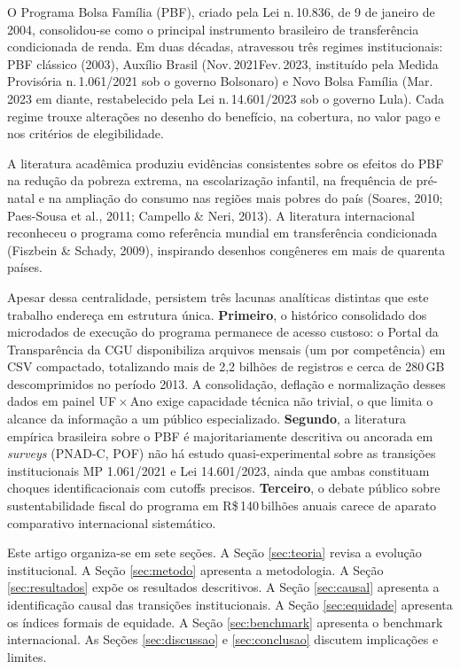 \documentclass[12pt,a4paper,oneside]{article}
\newcommand{\rs}{R\$\,}
\begin{document}
O Programa Bolsa Família (PBF), criado pela Lei n.\,10.836, de 9 de
janeiro de 2004, consolidou-se como o principal instrumento brasileiro
de transferência condicionada de renda. Em duas décadas, atravessou
três regimes institucionais: PBF clássico (2003),
Auxílio Brasil (Nov.\,2021\textendash Fev.\,2023, instituído pela
Medida Provisória n.\,1.061/2021 sob o governo Bolsonaro) e Novo
Bolsa Família (Mar.\,2023 em diante, restabelecido pela Lei
n.\,14.601/2023 sob o governo Lula). Cada regime trouxe alterações
no desenho do benefício, na cobertura, no valor pago e nos critérios
de elegibilidade.

A literatura acadêmica produziu evidências consistentes sobre os
efeitos do PBF na redução da pobreza extrema, na escolarização
infantil, na frequência de pré-natal e na ampliação do consumo nas
regiões mais pobres do país (Soares, 2010; Paes-Sousa et al., 2011; Campello \& Neri, 2013). A literatura internacional reconheceu o
programa como referência mundial em transferência
condicionada (Fiszbein \& Schady, 2009), inspirando desenhos congêneres
em mais de quarenta países.

Apesar dessa centralidade, persistem três lacunas analíticas
distintas que este trabalho endereça em estrutura única.
\textbf{Primeiro}, o histórico consolidado dos microdados de
execução do programa permanece de acesso custoso: o Portal da
Transparência da CGU disponibiliza arquivos mensais (um por
competência) em CSV compactado, totalizando mais de 2,2 bilhões de
registros e cerca de 280\,GB descomprimidos no período
2013. A consolidação, deflação e normalização
desses dados em painel UF\,$\times$\,Ano exige capacidade técnica
não trivial, o que limita o alcance da informação a um público
especializado. \textbf{Segundo}, a literatura empírica brasileira
sobre o PBF é majoritariamente descritiva ou ancorada em
\textit{surveys} (PNAD-C, POF) \textemdash{} não há estudo
quasi-experimental sobre as transições institucionais MP 1.061/2021
e Lei 14.601/2023, ainda que ambas constituam choques
identificacionais com cutoffs precisos. \textbf{Terceiro}, o debate
público sobre sustentabilidade fiscal do programa em \rs 140\,bilhões
anuais carece de aparato comparativo internacional sistemático.

Este artigo organiza-se em sete seções. A Seção
\ref{sec:teoria} revisa a evolução institucional. A Seção
\ref{sec:metodo} apresenta a metodologia. A Seção
\ref{sec:resultados} expõe os resultados descritivos. A Seção
\ref{sec:causal} apresenta a identificação causal das transições
institucionais. A Seção \ref{sec:equidade} apresenta os índices
formais de equidade. A Seção \ref{sec:benchmark} apresenta o
benchmark internacional. As Seções \ref{sec:discussao} e
\ref{sec:conclusao} discutem implicações e limites.
\end{document}
